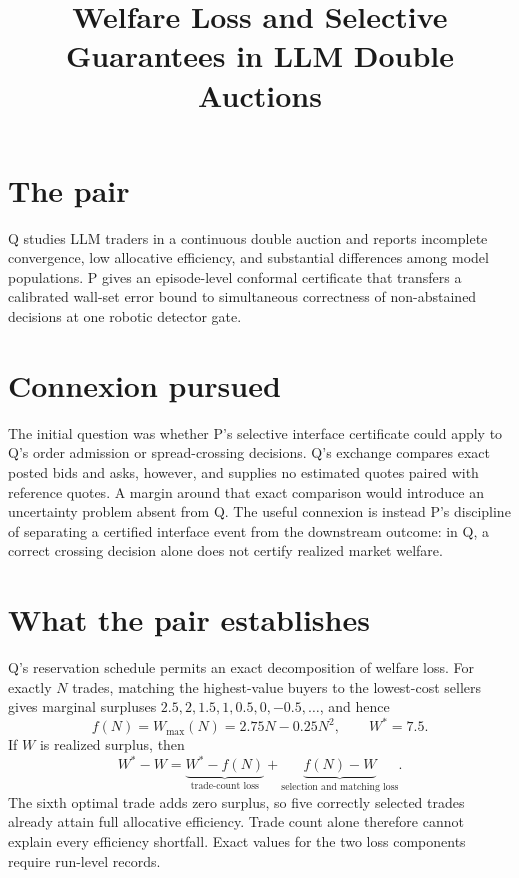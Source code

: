 \documentclass{article}
\title{Welfare Loss and Selective Guarantees in LLM Double Auctions}
\begin{document}
\maketitle

\section{The pair}

Q studies LLM traders in a continuous double auction and reports incomplete convergence, low allocative efficiency, and substantial differences among model populations. P gives an episode-level conformal certificate that transfers a calibrated wall-set error bound to simultaneous correctness of non-abstained decisions at one robotic detector gate. 

\section{Connexion pursued}

The initial question was whether P's selective interface certificate could apply to Q's order admission or spread-crossing decisions. Q's exchange compares exact posted bids and asks, however, and supplies no estimated quotes paired with reference quotes. A margin around that exact comparison would introduce an uncertainty problem absent from Q. The useful connexion is instead P's discipline of separating a certified interface event from the downstream outcome: in Q, a correct crossing decision alone does not certify realized market welfare. 

\section{What the pair establishes}

Q's reservation schedule permits an exact decomposition of welfare loss. For exactly \(N\) trades, matching the highest-value buyers to the lowest-cost sellers gives marginal surpluses \(2.5,2,1.5,1,0.5,0,-0.5,\ldots\), and hence
\[
 f(N)=W_{\max}(N)=2.75N-0.25N^2,
 \qquad W^*=7.5.
\]
If \(W\) is realized surplus, then
\[
 W^*-W
 =
 \underbrace{W^*-f(N)}_{\text{trade-count loss}}
 +
 \underbrace{f(N)-W}_{\text{selection and matching loss}}.
\]
The sixth optimal trade adds zero surplus, so five correctly selected trades already attain full allocative efficiency. Trade count alone therefore cannot explain every efficiency shortfall. Exact values for the two loss components require run-level records. 
\end{document}
